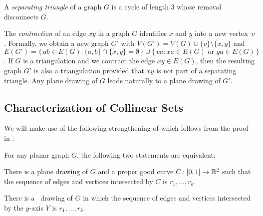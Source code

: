 A \emph{separating triangle} of a graph $G$ is
a cycle of length 3
 whose removal disconnects $G$.

The \emph{contraction} of an edge $xy$ in a graph $G$ identifies $x$
and $y$
into a new vertex~$v$.
Formally, we obtain a new graph $G'$ with
$V(G')=V(G)\cup\{v\}\setminus\{x,y\}$ and $E(G')=%
\{\,ab\in
E(G): \{a,b\}\cap\{x,y\}=\emptyset\,\}\cup\{\,va: xa\in E(G)\text{ or }
ya\in E(G)\,\}$.  
If $G$ is a triangulation and we
contract the edge $xy\in E(G)$, then the resulting graph $G'$ is also
a triangulation provided that $xy$ is not part of a separating
triangle. %
Any plane drawing of $G$ leads naturally
to a plane drawing of $G'$.

\subsection{Characterization of Collinear Sets}





We will make use of the following strengthening of 
which follows from the proof in \cite{dalozzo.dujmovic.ea:drawing}:
\begin{thm}
  For any planar graph $G$, the following two statements are equivalent:
  \begin{compactenum}
    \item There is a plane drawing of $G$ and a proper good curve $C\colon
      [0,1]\to\mathbb{R}^2$ such that the sequence of edges and vertices
      intersected by $C$ is $r_1,\ldots,r_k$.
    \item There is a \Fary\ drawing of $G$ in which the sequence of
      edges and vertices intersected by the $y$-axis $Y$ is $r_1,\ldots,r_k$.
  \end{compactenum}
\end{thm}


